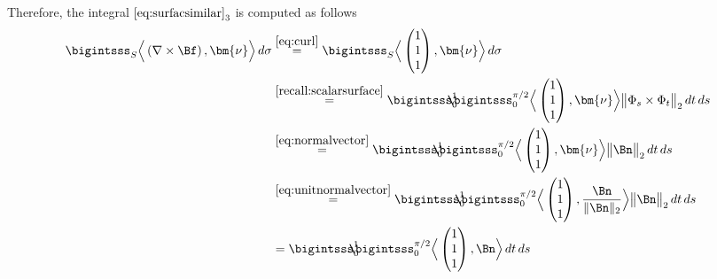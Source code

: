 \documentclass[12pt]{article}
\begin{document}
\begin{enumerate}[(i)]
	      Therefore, the integral $\eqref{eq:surfacsimilar}_{3}$
	      is computed as follows
	      \begin{align}
		      \bigintsss_{S} \Big\langle \left( \nabla \times \Bf \right), \bm{\nu} \Big\rangle \, d\sigma
		       & 
		      \stackrel{\eqref{eq:curl}}{=}
		      \bigintsss_{S} \Big\langle \begin{pmatrix} 1\\1\\1\end{pmatrix}, \bm{\nu} \Big\rangle \, d\sigma \\
		       & 
		      \stackrel{\eqref{recall:scalarsurface}}{=}
		      \bigintsss_{0}^{1} \!\!\!\!\! \bigintsss_{0}^{\pi/2}
		      \Big\langle \begin{pmatrix} 1\\1\\1\end{pmatrix}, \bm{\nu} \Big\rangle 
		      \big\| \Phi_s \times \Phi_t \big\|_2 \, dt \,ds                                                  \\
		       & 
		      \stackrel{\eqref{eq:normalvector}}{=}
		      \bigintsss_{0}^{1} \!\!\!\!\! \bigintsss_{0}^{\pi/2}
		      \Big\langle \begin{pmatrix} 1\\1\\1\end{pmatrix}, \bm{\nu} \Big\rangle 
		      \big\| \Bn \big\|_2 \, dt \,ds                                                                   \\
		       & 
		      \stackrel{\eqref{eq:unitnormalvector}}{=}
		      \bigintsss_{0}^{1} \!\!\!\!\! \bigintsss_{0}^{\pi/2}
		      \Big\langle \begin{pmatrix} 1\\1\\1\end{pmatrix}, \frac{\Bn}{\| \Bn \|_2} \Big\rangle 
		      \big\| \Bn \big\|_2 \, dt \,ds                                                                   
		      \label{eq:canceledoutvector}                                                                     \\
		       & 
		      =
		      \bigintsss_{0}^{1} \!\!\!\!\! \bigintsss_{0}^{\pi/2}
		      \Big\langle \begin{pmatrix} 1\\1\\1\end{pmatrix}, \Bn \Big\rangle  \, dt \,ds                    \\

\end{align}
\end{enumerate}
\end{document}

